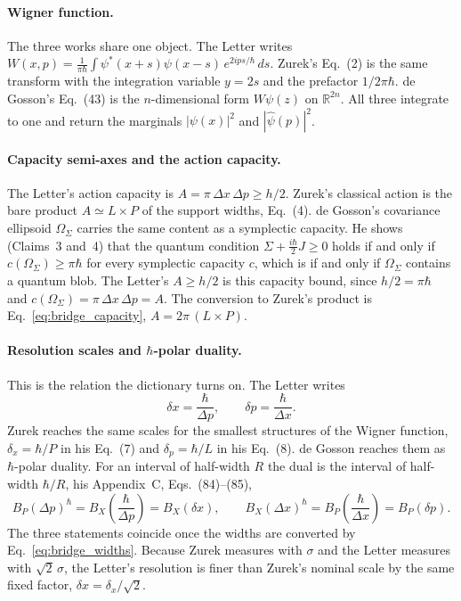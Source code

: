 \documentclass[%
  aps, amsmath, amssymb, onecolumn, 11pt
]{revtex4-2}
\begin{document}
\paragraph{Wigner function.}
The three works share one object. The Letter writes
$W(x,p)=\frac{1}{\pi\hbar}\int \psi^*(x+s)\psi(x-s)\,e^{2ips/\hbar}\,ds$.
Zurek's Eq.~(2) is the same transform with the integration variable
$y=2s$ and the prefactor $1/2\pi\hbar$. de Gosson's Eq.~(43) is the
$n$-dimensional form $W\psi(z)$ on $\mathbb{R}^{2n}$. All three integrate
to one and return the marginals $|\psi(x)|^2$ and $|\widehat\psi(p)|^2$.

\paragraph{Capacity semi-axes and the action capacity.}
The Letter's action capacity is $A=\pi\,\Delta x\,\Delta p\ge h/2$.
Zurek's classical action is the bare product $A\simeq L\times P$ of the
support widths, Eq.~(4). de Gosson's covariance ellipsoid $\Omega_\Sigma$
carries the same content as a symplectic capacity. He shows (Claims~3
and~4) that the quantum condition $\Sigma+\tfrac{i\hbar}{2}J\ge 0$ holds if
and only if $c(\Omega_\Sigma)\ge\pi\hbar$ for every symplectic capacity
$c$, which is if and only if $\Omega_\Sigma$ contains a quantum blob. The
Letter's $A\ge h/2$ is this capacity bound, since $h/2=\pi\hbar$
and $c(\Omega_\Sigma)=\pi\,\Delta x\,\Delta p=A$. The conversion to
Zurek's product is Eq.~\eqref{eq:bridge_capacity}, $A=2\pi\,(L\times P)$.

\paragraph{Resolution scales and $\hbar$-polar duality.}
This is the relation the dictionary turns on. The Letter writes
\begin{equation}
\delta x=\frac{\hbar}{\Delta p}, \qquad \delta p=\frac{\hbar}{\Delta x}.
\label{eq:resolution}
\end{equation}
Zurek reaches the same scales for the smallest structures of the Wigner
function, $\delta_x=\hbar/P$ in his Eq.~(7) and $\delta_p=\hbar/L$ in his
Eq.~(8). de Gosson reaches them as $\hbar$-polar duality. For an interval
of half-width $R$ the dual is the interval of half-width $\hbar/R$, his
Appendix~C, Eqs.~(84)--(85),
\begin{equation}
B_P(\Delta p)^\hbar=B_X\!\left(\frac{\hbar}{\Delta p}\right)=B_X(\delta x),
\qquad
B_X(\Delta x)^\hbar=B_P\!\left(\frac{\hbar}{\Delta x}\right)=B_P(\delta p).
\label{eq:polar_intervals}
\end{equation}
The three statements coincide once the widths are converted by
Eq.~\eqref{eq:bridge_widths}. Because Zurek measures with $\sigma$ and the
Letter measures with $\sqrt{2}\,\sigma$, the Letter's resolution is finer
than Zurek's nominal scale by the same fixed factor,
$\delta x=\delta_x/\sqrt{2}$.
\end{document}
